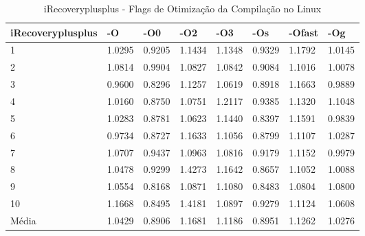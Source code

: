 \begin{table}[!ht]
\centering
\caption{iRecoveryplusplus - Flags de Otimização da Compilação no Linux}
\label{tab:otimizacao_compilacao:linux:irecoveryplusplus}
\begin{tabular}{llllllll}
\textbf{iRecoveryplusplus} & \textbf{-O}  & \textbf{-O0}   & \textbf{-O2} & \textbf{-O3} & \textbf{-Os} & \textbf{-Ofast} & \textbf{-Og} \\ \toprule
1                          & 1.0295       &   0.9205       &  1.1434      &   1.1348     & 0.9329       &   1.1792        &  1.0145      \\ 
2                          & 1.0814       &   0.9904       &  1.0827      &   1.0842     & 0.9084       &   1.1016        &  1.0078      \\ 
3                          & 0.9600       &   0.8296       &  1.1257      &   1.0619     & 0.8918       &   1.1663        &  0.9889      \\ 
4                          & 1.0160       &   0.8750       &  1.0751      &   1.2117     & 0.9385       &   1.1320        &  1.1048      \\ 
5                          & 1.0283       &   0.8781       &  1.0623      &   1.1440     & 0.8397       &   1.1591        &  0.9839      \\ 
6                          & 0.9734       &   0.8727       &  1.1633      &   1.1056     & 0.8799       &   1.1107        &  1.0287      \\ 
7                          & 1.0707       &   0.9437       &  1.0963      &   1.0816     & 0.9179       &   1.1152        &  0.9979      \\ 
8                          & 1.0478       &   0.9299       &  1.4273      &   1.1642     & 0.8657       &   1.1052        &  1.0088      \\ 
9                          & 1.0554       &   0.8168       &  1.0871      &   1.1080     & 0.8483       &   1.0804        &  1.0800      \\ 
10                         & 1.1668       &   0.8495       &  1.4181      &   1.0897     & 0.9279       &   1.1124        &  1.0608      \\ \bottomrule
Média                      & 1.0429       &   0.8906       &  1.1681      &   1.1186     & 0.8951       &   1.1262        &  1.0276      \\ 
\end{tabular}
\end{table}

